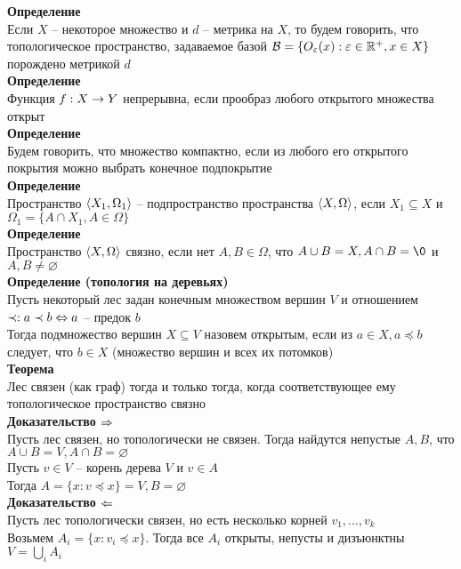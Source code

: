 \documentclass[12pt]{article}
\begin{document}
\textbf{Определение}\\
Если $X$ -- некоторое множество и $d$ -- метрика на $X$, то будем говорить, что топологическое пространство, задаваемое базой $\mathcal{B} = \{O_\varepsilon(x): \varepsilon \in \mathbb{R}^+, x \in X\}$ порождено метрикой $d$\\
\textbf{Определение}\\
Функция $f: X \rightarrow Y$ непрерывна, если прообраз любого открытого множества открыт\\
\textbf{Определение}\\
Будем говорить, что множество компактно, если из любого его открытого покрытия можно выбрать конечное подпокрытие\\
\textbf{Определение}\\
Пространство $\langle X_1, \Omega_1 \rangle$ -- подпространство пространства $\langle X, \Omega \rangle$, если $X_1\subseteq X$ и $\Omega_1 = \{A \cap X_1, A \in \Omega\}$\\
\textbf{Определение}\\
Пространство $\langle X, \Omega \rangle$ связно, если нет $A, B\in \Omega$, что $A \cup B = X, A \cap B = \0$ и $A, B \neq \varnothing$\\
\textbf{Определение (топология на деревьях)}\\
Пусть некоторый лес задан конечным множеством вершин $V$ и отношением $\prec: a \prec b \Leftrightarrow a$ -- предок $b$\\
Тогда подмножество вершин $X \subseteq V$ назовем открытым, если из $a \in X, a\preceq b$ следует, что $b \in X$ (множество вершин и всех их потомков)\\
\textbf{Теорема}\\
Лес связен (как граф) тогда и только тогда, когда соответствующее ему топологическое пространство связно\\
\textbf{Доказательство $\Rightarrow$}\\
Пусть лес связен, но топологически не связен. Тогда найдутся непустые $A, B$, что $A \cup B = V, A \cap B = \varnothing$\\
Пусть $v \in V$ -- корень дерева $V$ и $v \in A$\\
Тогда $A = \{x: v \preceq x\} = V, B = \varnothing$\\
\textbf{Доказательство $\Leftarrow$}\\
Пусть лес топологически связен, но есть несколько корней $v_1, \ldots, v_k$\\
Возьмем $A_i = \{x: v_i \preceq x\}$. Тогда все $A_i$ открыты, непусты и дизъюнктны\\
$V = \bigcup_i A_i$\\
\end{document}
